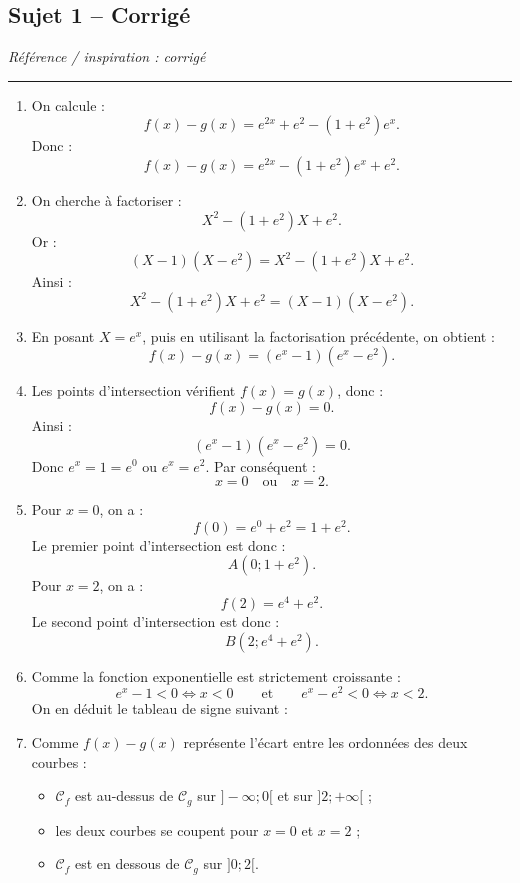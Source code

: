 \documentclass[11pt,a4paper]{article}
\newcommand{\titreSujet}[2]{%
  \subsection*{#1}
  \addcontentsline{toc}{subsection}{#1}
  \textit{Référence / inspiration : #2}\par\medskip\hrule\medskip
}
\begin{document}
\titreSujet{Sujet 1 -- Corrigé}{corrigé}
\begin{enumerate}
\item On calcule :
\[
f(x)-g(x)=e^{2x}+e^2-(1+e^2)e^x.
\]
Donc :
\[
f(x)-g(x)=e^{2x}-(1+e^2)e^x+e^2.
\]

\item On cherche à factoriser :
\[
X^2-(1+e^2)X+e^2.
\]
Or :
\[
(X-1)(X-e^2)=X^2-(1+e^2)X+e^2.
\]
Ainsi :
\[
X^2-(1+e^2)X+e^2=(X-1)(X-e^2).
\]

\item En posant $X=e^x$, puis en utilisant la factorisation précédente, on obtient :
\[
f(x)-g(x)=(e^x-1)(e^x-e^2).
\]

\item Les points d'intersection vérifient $f(x)=g(x)$, donc :
\[
f(x)-g(x)=0.
\]
Ainsi :
\[
(e^x-1)(e^x-e^2)=0.
\]
Donc $e^x=1=e^0$ ou $e^x=e^2$. Par conséquent :
\[
x=0\quad\text{ou}\quad x=2.
\]

\item Pour $x=0$, on a :
\[
f(0)=e^0+e^2=1+e^2.
\]
Le premier point d'intersection est donc :
\[
A(0;1+e^2).
\]
Pour $x=2$, on a :
\[
f(2)=e^4+e^2.
\]
Le second point d'intersection est donc :
\[
B(2;e^4+e^2).
\]

\item Comme la fonction exponentielle est strictement croissante :
\[
e^x-1<0 \Longleftrightarrow x<0
\qquad\text{et}\qquad
e^x-e^2<0 \Longleftrightarrow x<2.
\]
On en déduit le tableau de signe suivant :
\begin{center}
\end{center}

\item Comme $f(x)-g(x)$ représente l'écart entre les ordonnées des deux courbes :
\begin{itemize}
\item $\mathcal C_f$ est au-dessus de $\mathcal C_g$ sur $]-\infty;0[$ et sur $]2;+\infty[$ ;
\item les deux courbes se coupent pour $x=0$ et $x=2$ ;
\item $\mathcal C_f$ est en dessous de $\mathcal C_g$ sur $]0;2[$.
\end{itemize}


\end{enumerate}
\end{document}
